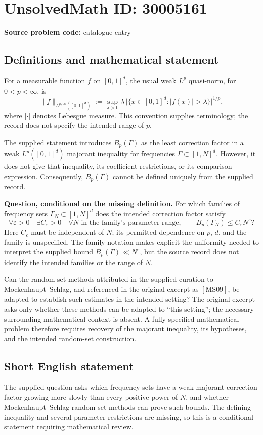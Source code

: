 \documentclass[11pt]{article}
\begin{document}
\section*{UnsolvedMath ID: 30005161}
\textbf{Source problem code:} catalogue entry
\subsection{Definitions and mathematical statement}
For a measurable function \(f\) on \([0,1]^d\), the usual weak \(L^p\) quasi-norm, for \(0<p<\infty\), is
\[
\|f\|_{L^{p,\infty}([0,1]^d)}
:=\sup_{\lambda>0}\lambda\,\bigl|\{x\in[0,1]^d:|f(x)|>\lambda\}\bigr|^{1/p},
\]
where \(|\cdot|\) denotes Lebesgue measure. This convention supplies terminology; the record does not specify the intended range of \(p\).

The supplied statement introduces \(B_p(\Gamma)\) as the least correction factor in a weak \(L^p([0,1]^d)\) majorant inequality for frequencies \(\Gamma\subset[1,N]^d\). However, it does not give that inequality, its coefficient restrictions, or its comparison expression. Consequently, \(B_p(\Gamma)\) cannot be defined uniquely from the supplied record.

\textbf{Question, conditional on the missing definition.} For which families of frequency sets \(\Gamma_N\subset[1,N]^d\) does the intended correction factor satisfy
\[
\forall\varepsilon>0\quad\exists C_{\varepsilon}>0\quad
\forall N\text{ in the family's parameter range},\qquad
B_p(\Gamma_N)\le C_{\varepsilon}N^{\varepsilon}?
\]
Here \(C_{\varepsilon}\) must be independent of \(N\); its permitted dependence on \(p\), \(d\), and the family is unspecified. The family notation makes explicit the uniformity needed to interpret the supplied bound \(B_p(\Gamma)\ll N^{\varepsilon}\), but the source record does not identify the intended families or the range of \(N\).

Can the random-set methods attributed in the supplied curation to Mockenhaupt--Schlag, and referenced in the original excerpt as \([\mathrm{MS09}]\), be adapted to establish such estimates in the intended setting? The original excerpt asks only whether these methods can be adapted to ``this setting''; the necessary surrounding mathematical context is absent. A fully specified mathematical problem therefore requires recovery of the majorant inequality, its hypotheses, and the intended random-set construction.
\subsection{Short English statement}
The supplied question asks which frequency sets have a weak majorant correction factor growing more slowly than every positive power of \(N\), and whether Mockenhaupt--Schlag random-set methods can prove such bounds. The defining inequality and several parameter restrictions are missing, so this is a conditional statement requiring mathematical review.
\end{document}
